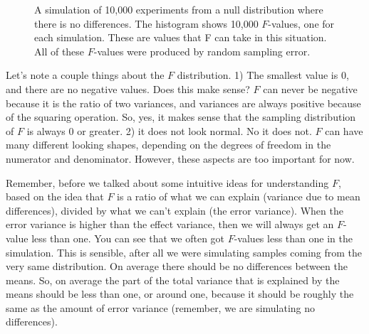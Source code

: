 \documentclass[
  letterpaper,
  DIV=11,
  numbers=noendperiod]{scrreprt}
\begin{document}
\begin{figure}


\caption{\label{fig-8fnull}A simulation of 10,000 experiments from a
null distribution where there is no differences. The histogram shows
10,000 \(F\)-values, one for each simulation. These are values that F
can take in this situation. All of these \(F\)-values were produced by
random sampling error.}

\end{figure}%

Let's note a couple things about the \(F\) distribution. 1) The smallest
value is 0, and there are no negative values. Does this make sense?
\(F\) can never be negative because it is the ratio of two variances,
and variances are always positive because of the squaring operation. So,
yes, it makes sense that the sampling distribution of \(F\) is always 0
or greater. 2) it does not look normal. No it does not. \(F\) can have
many different looking shapes, depending on the degrees of freedom in
the numerator and denominator. However, these aspects are too important
for now.

Remember, before we talked about some intuitive ideas for understanding
\(F\), based on the idea that \(F\) is a ratio of what we can explain
(variance due to mean differences), divided by what we can't explain
(the error variance). When the error variance is higher than the effect
variance, then we will always get an \(F\)-value less than one. You can
see that we often got \(F\)-values less than one in the simulation. This
is sensible, after all we were simulating samples coming from the very
same distribution. On average there should be no differences between the
means. So, on average the part of the total variance that is explained
by the means should be less than one, or around one, because it should
be roughly the same as the amount of error variance (remember, we are
simulating no differences).
\end{document}
